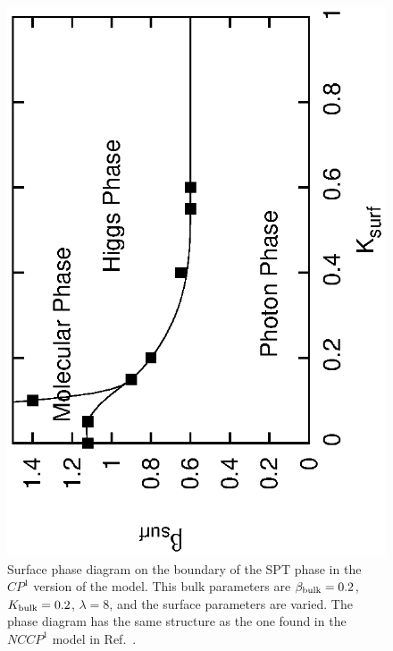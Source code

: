 \documentclass[prb,twocolumn]{revtex4-1}
\begin{document}
\begin{figure}
\includegraphics[angle=-90,width=\linewidth]{figures/cp1surfphase.eps}
\caption{Surface phase diagram on the boundary of the SPT phase in the $CP^1$ version of the model. This bulk parameters are $\beta_{\rm bulk}=0.2$, $K_{\rm bulk}=0.2$, $\lambda=8$, and the surface parameters are varied. The phase diagram has the same structure as the one found in the $NCCP^1$ model in Ref.~. }
\label{cp1surfphase}
\end{figure}


\end{document}
